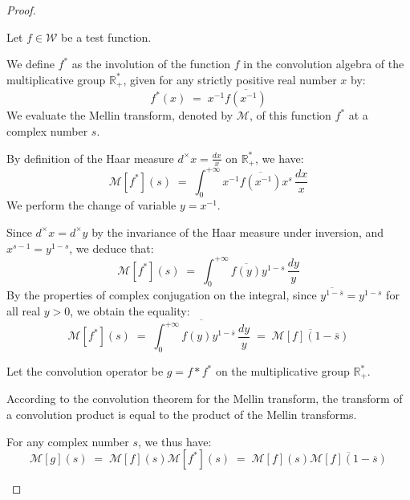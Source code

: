 \documentclass[Riemann_Hypothesis.tex]{subfiles}
\begin{document}
\begin{proof}
    \begin{part_proof}
        Let $f \in \mathcal{W}$ be a test function. \par
        We define $f^*$ as the involution of the function $f$ in the convolution algebra of the multiplicative group $\mathbb{R}_+^*$, given for any strictly positive real number $x$ by:
        \begin{equation*}
            f^*(x) \;=\; x^{-1} \overline{f\left(x^{-1}\right)}
        \end{equation*}
        We evaluate the Mellin transform, denoted by $\mathcal{M}$, of this function $f^*$ at a complex number $s$. \par
        By definition of the Haar measure $d^\times x = \frac{dx}{x}$ on $\mathbb{R}_+^*$, we have:
        \begin{equation*}
            \mathcal{M}[f^*](s) \;=\; \int_{0}^{+\infty} x^{-1} \overline{f\left(x^{-1}\right)} x^s \, \frac{dx}{x}
        \end{equation*}
        We perform the change of variable $y = x^{-1}$. \par
        Since $d^\times x = d^\times y$ by the invariance of the Haar measure under inversion, and $x^{s-1} = y^{1-s}$, we deduce that:
        \begin{equation*}
            \mathcal{M}[f^*](s) \;=\; \int_{0}^{+\infty} \overline{f(y)} y^{1-s} \, \frac{dy}{y}
        \end{equation*}
        By the properties of complex conjugation on the integral, since $\overline{y^{1-\overline{s}}} = y^{1-s}$ for all real $y > 0$, we obtain the equality:
        \begin{equation*}
            \mathcal{M}[f^*](s) \;=\; \overline{ \int_{0}^{+\infty} f(y) y^{1-\overline{s}} \, \frac{dy}{y} } \;=\; \overline{\mathcal{M}[f](1-\overline{s})}
        \end{equation*}
    \end{part_proof}
    \begin{part_proof}
        Let the convolution operator be $g = f * f^*$ on the multiplicative group $\mathbb{R}_+^*$. \par
        According to the convolution theorem for the Mellin transform, the transform of a convolution product is equal to the product of the Mellin transforms. \par
        For any complex number $s$, we thus have:
        \begin{equation*}
            \mathcal{M}[g](s) \;=\; \mathcal{M}[f](s) \mathcal{M}[f^*](s) \;=\; \mathcal{M}[f](s) \overline{\mathcal{M}[f](1-\overline{s})}

\end{equation*}
\end{part_proof}
\end{proof}
\end{document}
